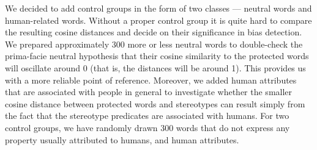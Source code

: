 \documentclass[12pt,]{book}
\newenvironment{Shaded}{\begin{snugshade}}{\end{snugshade}}
\newcommand{\KeywordTok}[1]{\textcolor[rgb]{0.13,0.29,0.53}{\textbf{#1}}}
\newcommand{\DataTypeTok}[1]{\textcolor[rgb]{0.13,0.29,0.53}{#1}}
\newcommand{\DecValTok}[1]{\textcolor[rgb]{0.00,0.00,0.81}{#1}}
\newcommand{\StringTok}[1]{\textcolor[rgb]{0.31,0.60,0.02}{#1}}
\newcommand{\CommentTok}[1]{\textcolor[rgb]{0.56,0.35,0.01}{\textit{#1}}}
\newcommand{\OtherTok}[1]{\textcolor[rgb]{0.56,0.35,0.01}{#1}}
\newcommand{\OperatorTok}[1]{\textcolor[rgb]{0.81,0.36,0.00}{\textbf{#1}}}
\newcommand{\NormalTok}[1]{#1}
\begin{document}
We decided to add control groups in the form of two classes --- neutral
words and human-related words. Without a proper control group it is
quite hard to compare the resulting cosine distances and decide on their
significance in bias detection. We prepared approximately
300 more or less neutral words to double-check the
prima-facie neutral hypothesis that their cosine similarity to the
protected words will oscillate around 0 (that is, the distances will be
around 1). This provides us with a more reliable point of reference.
Moreover, we added human attributes that are associated with people in
general to investigate whether the smaller cosine distance between
protected words and stereotypes can result simply from the fact that the
stereotype predicates are associated with humans. For two control
groups, we have randomly drawn 300 words that do not express any
property usually attributed to humans, and human attributes.

\vspace{1mm} \footnotesize

\begin{Shaded}
\end{Shaded}
\end{document}
